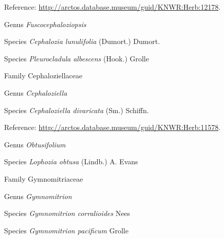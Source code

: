 \documentclass[9pt, article]{memoir}
\begin{document}
\begin{multicols}{2}
\vspace{6pt}Reference: 
\url{http://arctos.database.museum/guid/KNWR:Herb:12178}.

\vspace{6pt}\noindent\hspace{30pt}Genus \textit{Fuscocephaloziopsis}


\vspace{6pt}\noindent\hspace{36pt}Species \textit{Cephalozia lunulifolia} (Dumort.) Dumort.


\vspace{6pt}\noindent\hspace{36pt}Species \textit{Pleurocladula albescens} (Hook.) Grolle


\vspace{6pt}\noindent\hspace{24pt}Family Cephaloziellaceae


\vspace{6pt}\noindent\hspace{30pt}Genus \textit{Cephaloziella}


\vspace{6pt}\noindent\hspace{36pt}Species \textit{Cephaloziella divaricata} (Sm.) Schiffn.


\vspace{6pt}Reference: 
\url{http://arctos.database.museum/guid/KNWR:Herb:11578}.

\vspace{6pt}\noindent\hspace{30pt}Genus \textit{Obtusifolium}


\vspace{6pt}\noindent\hspace{36pt}Species \textit{Lophozia obtusa} (Lindb.) A. Evans


\vspace{6pt}\noindent\hspace{24pt}Family Gymnomitriaceae


\vspace{6pt}\noindent\hspace{30pt}Genus \textit{Gymnomitrion}


\vspace{6pt}\noindent\hspace{36pt}Species \textit{Gymnomitrion corralioides} Nees


\vspace{6pt}\noindent\hspace{36pt}Species \textit{Gymnomitrion pacificum} Grolle



\end{multicols}
\end{document}
